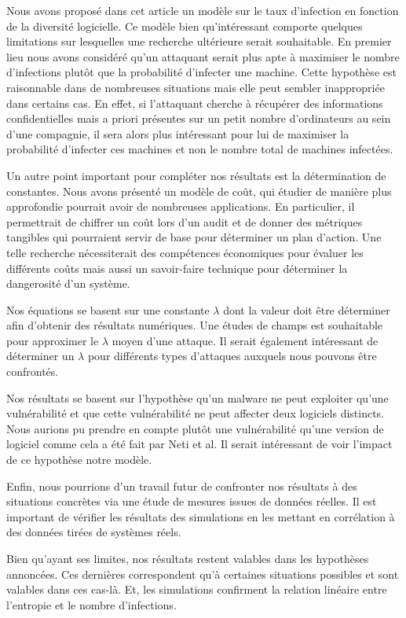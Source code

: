 Nous avons proposé dans cet article un modèle sur le taux d'infection en fonction de la diversité logicielle. Ce modèle bien
qu'intéressant comporte quelques limitations sur lesquelles une recherche ultérieure serait souhaitable. En premier lieu nous avons
considéré qu'un attaquant serait plus apte à maximiser le nombre d'infections plutôt que la probabilité d'infecter une machine.
Cette hypothèse est raisonnable dans de nombreuses situations mais elle peut sembler inappropriée dans certains cas. En effet, si
l'attaquant
cherche à récupérer des informations confidentielles mais a priori présentes sur un petit nombre d'ordinateurs au sein d'une
compagnie, il sera alors plus intéressant pour lui de maximiser la probabilité d'infecter ces machines et non le nombre total de machines infectées.


Un autre point important pour compléter nos résultats est la détermination de constantes. Nous avons présenté un
modèle de coût, qui étudier de manière plus approfondie pourrait avoir de nombreuses applications. En particulier, il permettrait de chiffrer un
coût lors d'un audit et de donner des métriques tangibles qui pourraient servir de base pour déterminer un plan
d'action. Une telle recherche nécessiterait des compétences économiques pour évaluer les différents coûts mais aussi un
savoir-faire technique pour déterminer la dangerosité d'un système.


Nos équations se basent sur une constante $\lambda$ dont la valeur doit être déterminer afin d'obtenir des résultats numériques. Une
études de champs est souhaitable pour approximer le $\lambda$ moyen d'une attaque. Il serait également intéressant de déterminer un
$\lambda$ pour différents types d'attaques auxquels nous pouvons être confrontés.


Nos résultats se basent sur l'hypothèse qu'un malware ne peut exploiter qu'une vulnérabilité et que cette vulnérabilité
ne peut affecter deux logiciels distincts. Nous aurions pu prendre en compte plutôt une vulnérabilité qu’une version de logiciel comme cela a été fait par  Neti et al.\cite{softwareDiversity:Security}
 Il serait intéressant de voir l'impact de ce hypothèse notre modèle.

Enfin, nous pourrions d'un travail futur de confronter nos résultats à des situations concrètes via une étude de mesures issues de
données réelles. Il est important de vérifier les résultats des simulations en les mettant en corrélation à des données tirées de systèmes réels. 


Bien qu'ayant ses limites, nos résultats restent valables dans les hypothèses annoncées. Ces dernières correspondent
qu'à certaines situations possibles et sont valables dans ces cas-là. Et, les simulations confirment la relation
linéaire entre l'entropie et le nombre d'infections. 
